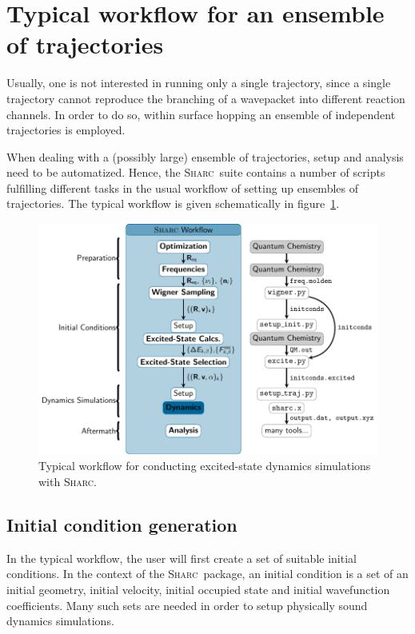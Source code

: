 \documentclass[a4paper,11pt,DIV=15,openany,twoside=false]{scrbook}
\newcommand{\sharc}{\textsc{Sharc}}
\begin{document}
\section{Typical workflow for an ensemble of trajectories}

Usually, one is not interested in running only a single trajectory, since a single trajectory cannot reproduce the branching of a wavepacket into different reaction channels. In order to do so, within surface hopping an ensemble of independent trajectories is employed. 

When dealing with a (possibly large) ensemble of trajectories, setup and analysis need to be automatized. Hence, the \sharc\ suite contains a number of scripts fulfilling different tasks in the usual workflow of setting up ensembles of trajectories.
The typical workflow is given schematically in figure~\ref{fig:workflow}.

\begin{figure}[h!]
  \centering
  \includegraphics[scale=1]{img/workflow/prepare.pdf}
  \caption{Typical workflow for conducting excited-state dynamics simulations with \sharc.}
  \label{fig:workflow}
\end{figure}

\subsection{Initial condition generation}

In the typical workflow, the user will first create a set of suitable initial conditions. In the context of the \sharc\ package, an initial condition is a set of an initial geometry, initial velocity, initial occupied state and initial wavefunction coefficients. 
Many such sets are needed in order to setup physically sound dynamics simulations.
\end{document}
